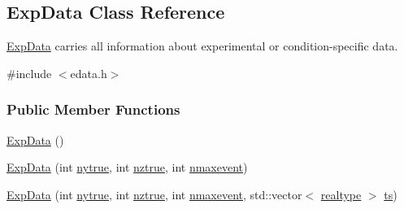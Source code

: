 \hypertarget{classamici_1_1_exp_data}{}\subsection{Exp\+Data Class Reference}
\label{classamici_1_1_exp_data}


\mbox{\hyperlink{classamici_1_1_exp_data}{Exp\+Data}} carries all information about experimental or condition-\/specific data.  




{\ttfamily \#include $<$edata.\+h$>$}

\subsubsection*{Public Member Functions}
\begin{DoxyCompactItemize}
\item 
\mbox{\hyperlink{classamici_1_1_exp_data_a19c9736cc55da621d8de182a76cc1e8f}{Exp\+Data}} ()
\item 
\mbox{\hyperlink{classamici_1_1_exp_data_af2322d528ad31a4335b0e5178b373649}{Exp\+Data}} (int \mbox{\hyperlink{classamici_1_1_exp_data_a54bcfe56ad0df183516d096adf4e0b26}{nytrue}}, int \mbox{\hyperlink{classamici_1_1_exp_data_a9a451378ba5572ef7a3fd4dd89e1c227}{nztrue}}, int \mbox{\hyperlink{classamici_1_1_exp_data_a48832d4f3a37c4fd75cc7f4ef578d1b1}{nmaxevent}})
\item 
\mbox{\hyperlink{classamici_1_1_exp_data_aa12ccb639686521566169ee3b62ab0ef}{Exp\+Data}} (int \mbox{\hyperlink{classamici_1_1_exp_data_a54bcfe56ad0df183516d096adf4e0b26}{nytrue}}, int \mbox{\hyperlink{classamici_1_1_exp_data_a9a451378ba5572ef7a3fd4dd89e1c227}{nztrue}}, int \mbox{\hyperlink{classamici_1_1_exp_data_a48832d4f3a37c4fd75cc7f4ef578d1b1}{nmaxevent}}, std\+::vector$<$ \mbox{\hyperlink{namespaceamici_a1bdce28051d6a53868f7ccbf5f2c14a3}{realtype}} $>$ \mbox{\hyperlink{classamici_1_1_exp_data_aa7014a80e7b102f85a10e3b9a480e8e5}{ts}})
\item 

\end{DoxyCompactItemize}
